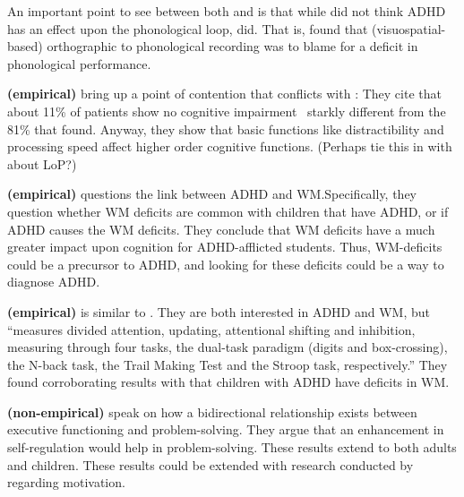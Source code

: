 \documentclass[stu]{apa7}
\begin{document}
An important point to see between both \textcite{raiker_phonological_2019} and \textcite{kofler_working_2020} is that while \textcite{kofler_working_2020} did not think ADHD has an effect upon the phonological loop, \textcite{raiker_phonological_2019} did. That is, \textcite{raiker_phonological_2019} found that (visuospatial-based) orthographic to phonological recording was to blame for a deficit in phonological performance.

\textcite{butzbach_basic_2019} \textbf{(empirical)} bring up a point of contention that conflicts with \textcite{kofler_working_2020}: They cite that about 11\% of patients show no cognitive impairment \textemdash\ starkly different from the 81\% that \textcite{kofler_working_2020} found. Anyway, they show that basic functions like distractibility and processing speed affect higher order cognitive functions. (Perhaps tie this in with \cite{raiker_phonological_2019} about LoP?)

\textcite{fried_clinical_2016} \textbf{(empirical)} questions the link between ADHD and WM.\@ Specifically, they question whether WM deficits are common with children that have ADHD, or if ADHD causes the WM deficits. They conclude that WM deficits have a much greater impact upon cognition for ADHD-afflicted students. Thus, WM-deficits could be a precursor to ADHD, and looking for these deficits could be a way to diagnose ADHD.\@

\textcite{elosua_differences_2017} \textbf{(empirical)} is similar to \textcite{fried_clinical_2016}. They are both interested in ADHD and WM, but \textcite{elosua_differences_2017} ``measures divided attention, updating, attentional shifting and inhibition, measuring through four tasks, the dual-task paradigm (digits and box-crossing), the N-back task, the Trail Making Test and the Stroop task, respectively.'' They found corroborating results with \textcite{fried_clinical_2016} that children with ADHD have deficits in WM.\@

\textcite{drigas_executive_2019} \textbf{(non-empirical)} speak on how a bidirectional relationship exists between executive functioning and problem-solving. They argue that an enhancement in self-regulation would help in problem-solving. These results extend to both adults and children. These results could be extended with research conducted by \textcite{skalski_impact_2021} regarding motivation.
\end{document}

